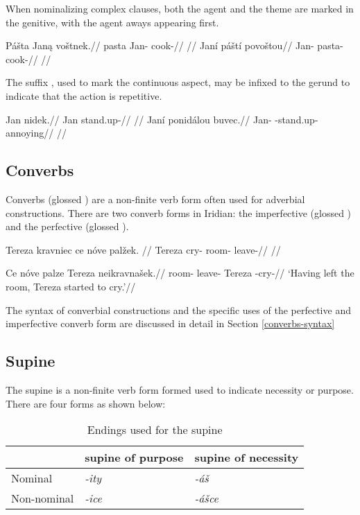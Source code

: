 When nominalizing complex clauses, both the agent and the theme are marked in the genitive, with the agent aways appearing first.

\pex
\a
\begingl
\gla P\'a\v{s}ta Jan\k{a} vo\v{s}tnek.//
\glb pasta Jan- cook-//
\glft {}//
\endgl
\a
\begingl
\gla Jan\'i p\'a\v{s}t\'i povo\v{s}tou//
\glb Jan- pasta- cook-//
\glft {}//
\endgl
\xe

The suffix , used to mark the continuous aspect, may be infixed to the gerund to indicate that the action is repetitive.

\pex
\a
\begingl
\gla Jan nidek.//
\glb Jan stand.up-//
\glft {}//
\endgl
\a
\begingl
\gla Jan\'i ponid\'alou buvec.//
\glb Jan- -stand.up- annoying//
\glft {}//
\endgl
\xe

\subsection{Converbs}
Converbs (glossed ) are a non-finite verb form often used for adverbial constructions. There are two converb forms in Iridian: the imperfective  (glossed ) and the perfective  (glossed ).

\pex
\begingl
\gla Tereza kravniec ce nóve pal\v{z}ek. //
\glb Tereza cry-  room- leave-//
\glft {}//
\endgl
\xe

\pex
\begingl
\gla Ce nóve palze Tereza neikravna\v{s}ek.//
\glb {} room- leave- Tereza -cry-//
\glft `Having left the room, Tereza started to cry.'//
\endgl
\xe

The syntax of converbial constructions and the specific uses of the perfective and imperfective converb form are discussed in detail in Section \ref{converbs-syntax}


\subsection{Supine}
The supine is a non-finite verb form formed used to indicate necessity or purpose. There are four forms as shown below:

\begin{table}[h!]
	\centering\small
	\caption{Endings used for the supine}
	\begin{tabularx}{0.8\textwidth}{MMM}
		\toprule
		&{\sc supine of purpose}&{\sc supine of necessity}\\
		\midrule
		Nominal & \textit{-ity} & \textit{-á\v{s}}\\
		\addlinespace
		Non-nominal & \textit{-ice} & \textit{-á\v{s}ce}\\
		\bottomrule
	\end{tabularx}
\end{table}


